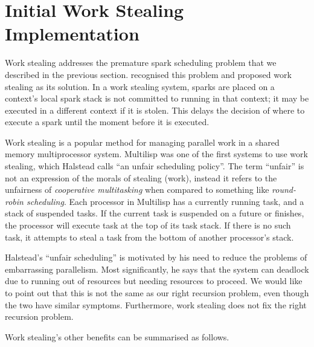
\section{Initial Work Stealing Implementation}
\label{sec:rts_work_stealing}


Work stealing addresses the premature spark scheduling problem that we
described in the previous section.
\citet{wang:2006:hons} recognised this problem and proposed work stealing as
its solution.
In a work stealing system,
sparks are placed on a context's local spark stack
is not committed to running in that context;
it may be executed in a different context if it is stolen.
This delays the decision of where to execute a spark until the moment
before it is executed.

Work stealing is a popular method for managing parallel work in a shared
memory multiprocessor system.
Multilisp \citep{halstead:1985:multilisp} was one of the first systems to
use work stealing,
which Halstead calls ``an unfair scheduling policy''.
The term ``unfair'' is not an expression of the morals of stealing (work),
instead it refers to the unfairness of \emph{cooperative multitasking} when
compared to something like \emph{round-robin scheduling}.
Each processor in Multilisp has a currently running task,
and a stack of suspended tasks.
If the current task is suspended on a future or finishes,
the processor will execute task at the top of its task stack.
If there is no such task,
it attempts to steal a task from the bottom of another processor's stack.

Halstead's ``unfair scheduling'' is motivated by his need to reduce the
problems of embarrassing parallelism.
Most significantly,
he says that the system can deadlock due to running out of resources but
needing resources to proceed.
We would like to point out that
this is not the same as our right recursion problem,
even though the two have similar symptoms.
Furthermore,
work stealing does not fix the right recursion problem.

Work stealing's other benefits can be summarised as follows.

